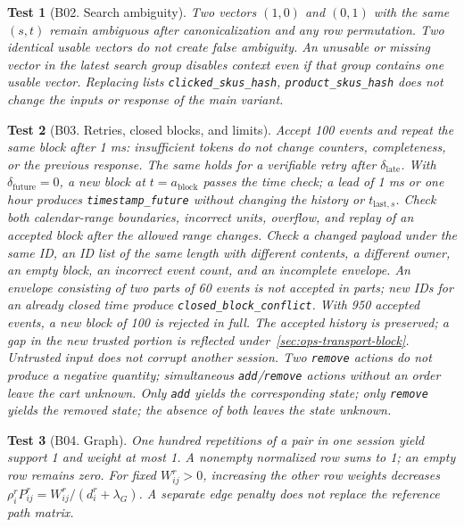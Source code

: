 \documentclass[12pt,a4paper]{article}
\newcommand{\code}[1]{{\ttfamily\small\nolinkurl{#1}}}
\theoremstyle{plainru}
\newtheorem{testcase}{Test}[section]
\begin{document}
\begin{testcase}[B02. Search ambiguity]
Two vectors $(1,0)$ and $(0,1)$ with the same $(s,t)$ remain
ambiguous after canonicalization and any row permutation.
Two identical usable vectors do not create false ambiguity.
An unusable or missing vector in the latest search group
disables context even if that group contains one usable vector.
Replacing lists \code{clicked_skus_hash}, \code{product_skus_hash}
does not change the inputs or response of the main variant.
\end{testcase}

\begin{testcase}[B03. Retries, closed blocks, and limits]
Accept 100 events and repeat the same block after 1 ms:
insufficient tokens do not change counters, completeness, or the previous response.
The same holds for a verifiable retry after $\delta_{\mathrm{late}}$.
With $\delta_{\mathrm{future}}=0$, a new block at $t=a_{\mathrm{block}}$
passes the time check; a lead of 1 ms or one hour produces
\code{timestamp_future} without changing the history or $t_{\mathrm{last},s}$.
Check both calendar-range boundaries, incorrect units,
overflow, and replay of an accepted block after the allowed range changes.
Check a changed payload under the same ID, an ID list of the same length
with different contents, a different owner,
an empty block, an incorrect event count, and an incomplete envelope.
An envelope consisting of two parts of 60 events is not accepted in parts;
new IDs for an already closed time produce \code{closed_block_conflict}.
With 950 accepted events, a new block of 100 is rejected in full.
The accepted history is preserved; a gap in the new trusted portion is reflected
under~\ref{sec:ops-transport-block}. Untrusted input does not corrupt another session.
Two \code{remove} actions do not produce a negative quantity; simultaneous
\code{add}/\code{remove} actions without an order leave the cart unknown.
Only \code{add} yields the corresponding state; only \code{remove}
yields the removed state; the absence of both leaves the state unknown.
\end{testcase}

\begin{testcase}[B04. Graph]
One hundred repetitions of a pair in one session yield support 1 and weight at most 1.
A nonempty normalized row sums to 1; an empty row remains zero.
For fixed $W_{ij}^r>0$, increasing the other row weights
decreases $\rho_i^rP_{ij}^r=W_{ij}^r/(d_i^r+\lambda_G)$.
A separate edge penalty does not replace the reference path matrix.
\end{testcase}
\end{document}
